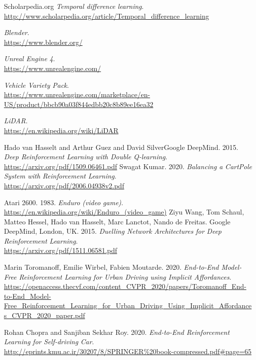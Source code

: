 \documentclass[14pt]{extarticle}
\begin{document}
\begin{thebibliography}{999}
  Scholarpedia.org
  \emph{Temporal difference learning}.\\
  \url{http://www.scholarpedia.org/article/Temporal_difference_learning}
 
  \emph{Blender}.\\
  \url{https://www.blender.org/}
   
  \emph{Unreal Engine 4}.\\
  \url{https://www.unrealengine.com/}
   
   
  \emph{Vehicle Variety Pack}.\\
  \url{https://www.unrealengine.com/marketplace/en-US/product/bbcb90a03f844edbb20c8b89ee16ea32}
  
  \emph{LiDAR}.\\
  \url{https://en.wikipedia.org/wiki/LiDAR}
  
  Hado van Hasselt and Arthur Guez and David SilverGoogle DeepMind. 2015.
  \emph{Deep Reinforcement Learning with Double Q-learning}.\\
  \url{  https://arxiv.org/pdf/1509.06461.pdf}
  Swagat Kumar. 2020.
  \emph{Balancing a CartPole System with Reinforcement Learning}.\\
  \url{https://arxiv.org/pdf/2006.04938v2.pdf}
 
 
  	Atari 2600. 1983.
  \emph{Enduro (video game)}.\\
  \url{https://en.wikipedia.org/wiki/Enduro_(video_game)}
  	Ziyu Wang, Tom Schaul, Matteo Hessel, Hado van Hasselt, Marc Lanctot, Nando de Freitas. Google DeepMind, London, UK. 2015.
  \emph{Duelling Network Architectures for Deep Reinforcement Learning}.\\
  \url{https://arxiv.org/pdf/1511.06581.pdf}
   
   
  	Marin Toromanoff, Emilie Wirbel, Fabien Moutarde. 2020.
  \emph{End-to-End Model-Free Reinforcement Learning
for Urban Driving using Implicit Affordances}.\\
  \url{https://openaccess.thecvf.com/content_CVPR_2020/papers/Toromanoff_End-to-End_Model-Free_Reinforcement_Learning_for_Urban_Driving_Using_Implicit_Affordances_CVPR_2020_paper.pdf}

  	Rohan Chopra and Sanjiban Sekhar Roy. 2020.
  \emph{End-to-End Reinforcement Learning
for Self-driving Car}.\\
  \url{http://eprints.kmu.ac.ir/30207/8/SPRINGER\%20book-compressed.pdf\#page=65}
  

\end{thebibliography}
\end{document}
